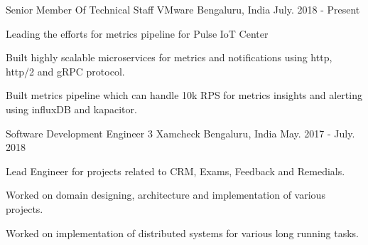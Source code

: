 \begin{cventries}
  \cventry
    {Senior Member Of Technical Staff} %
    {VMware} %
    {Bengaluru, India} %
    {July. 2018 - Present} %
    {
      \begin{cvitems} %
        \item {Leading the efforts for metrics pipeline for Pulse IoT Center}
        \item {Built highly scalable microservices for metrics and notifications using http, http/2 and gRPC protocol.}
        \item {Built metrics pipeline which can handle 10k RPS for metrics insights and alerting using influxDB and kapacitor.}
      \end{cvitems}
    }

  \cventry
    {Software Development Engineer 3} %
    {Xamcheck} %
    {Bengaluru, India} %
    {May. 2017 - July. 2018} %
    {
      \begin{cvitems} %
        \item {Lead Engineer for projects related to CRM, Exams, Feedback and Remedials.}
        \item {Worked on domain designing, architecture and implementation of various projects.}
        \item {Worked on implementation of distributed systems for various long running tasks. }
      \end{cvitems}
    }


\end{cventries}

